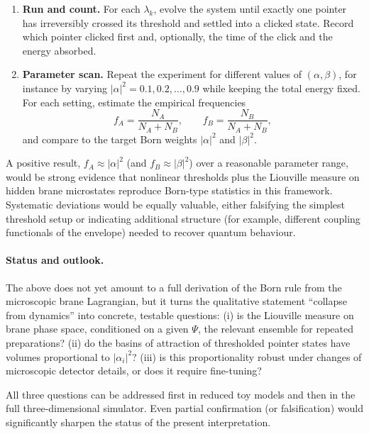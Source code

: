 \begin{enumerate}
    These perturbations leave $\Psi$ essentially unchanged but sample different points $\lambda_k$ within $\Gamma_\Psi$.
  \item \textbf{Run and count.}
    For each $\lambda_k$, evolve the system until exactly one pointer has irreversibly crossed its threshold and settled into a clicked state.
    Record which pointer clicked first and, optionally, the time of the click and the energy absorbed.
  \item \textbf{Parameter scan.}
    Repeat the experiment for different values of $(\alpha,\beta)$, for instance by varying $|\alpha|^2 = 0.1, 0.2, \dots, 0.9$ while keeping the total energy fixed.
    For each setting, estimate the empirical frequencies
    \begin{equation}
      f_A = \frac{N_A}{N_A+N_B},
      \qquad
      f_B = \frac{N_B}{N_A+N_B},
    \end{equation}
    and compare to the target Born weights $|\alpha|^2$ and $|\beta|^2$.
\end{enumerate}

A positive result, $f_A \approx |\alpha|^2$ (and $f_B \approx |\beta|^2$) over a reasonable parameter range, would be strong evidence that nonlinear thresholds plus the Liouville measure on hidden brane microstates reproduce Born-type statistics in this framework.
Systematic deviations would be equally valuable, either falsifying the simplest threshold setup or indicating additional structure (for example, different coupling functionals of the envelope) needed to recover quantum behaviour.

\paragraph{Status and outlook.}

The above does not yet amount to a full derivation of the Born rule from the microscopic brane Lagrangian, but it turns the qualitative statement ``collapse from dynamics'' into concrete, testable questions:
(i) is the Liouville measure on brane phase space, conditioned on a given $\Psi$, the relevant ensemble for repeated preparations?
(ii) do the basins of attraction of thresholded pointer states have volumes proportional to $|\alpha_i|^2$?
(iii) is this proportionality robust under changes of microscopic detector details, or does it require fine-tuning?

All three questions can be addressed first in reduced toy models and then in the full three-dimensional simulator.
Even partial confirmation (or falsification) would significantly sharpen the status of the present interpretation.

